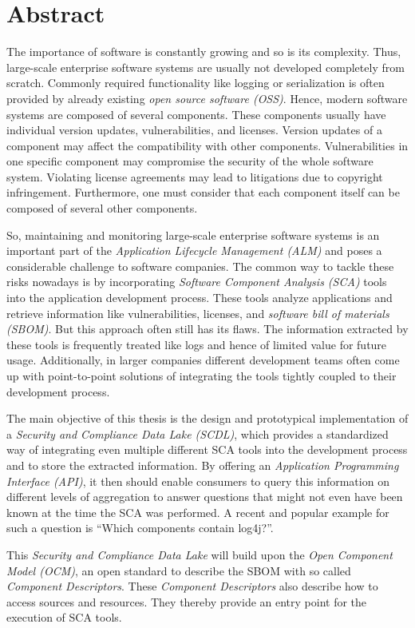 
\thispagestyle{plain}
\chapter*{Abstract}
The importance of software is constantly growing and so is its complexity. Thus, large-scale enterprise software systems are usually not developed completely from scratch. Commonly required functionality like logging or serialization is often provided by already existing \textit{open source software (OSS)}. Hence, modern software systems are composed of several components. These components usually have individual version updates, vulnerabilities, and licenses. Version updates of a component may affect the compatibility with other components. Vulnerabilities in one specific component may compromise the security of the whole software system. Violating license agreements may lead to litigations due to copyright infringement. Furthermore, one must consider that each component itself can be composed of several other components.\par
So, maintaining and monitoring large-scale enterprise software systems is an important part of the \textit{Application Lifecycle Management (ALM)} and poses a considerable challenge to software companies. The common way to tackle these risks nowadays is by incorporating \textit{Software Component Analysis (SCA)} tools into the application development process. These tools analyze applications and retrieve information like vulnerabilities, licenses, and \textit{software bill of materials (SBOM)}. But this approach often still has its flaws. The information extracted by these tools is frequently treated like logs and hence of limited value for future usage. Additionally, in larger companies different development teams often come up with point-to-point solutions of integrating the tools tightly coupled to their development process.\par
The main objective of this thesis is the design and prototypical implementation of a \textit{Security and Compliance Data Lake (SCDL)}, which provides a standardized way of integrating even multiple different SCA tools into the development process and to store the extracted information. By offering an \textit{Application Programming Interface (API)}, it then should enable consumers to query this information on different levels of aggregation to answer questions that might not even have been known at the time the SCA was performed. A recent and popular example for such a question is \enquote{Which components contain log4j?}.\par
This \textit{Security and Compliance Data Lake} will build upon the \textit{Open Component Model (OCM)}, an open standard to describe the SBOM with so called\textit{ Component Descriptors}. These \textit{Component Descriptors} also describe how to access sources and resources. They thereby provide an entry point for the execution of SCA tools.

\vfil
\pagestyle{fancy}